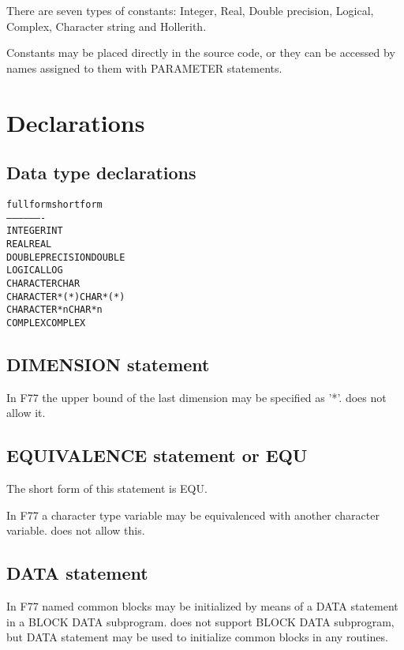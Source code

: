 There are seven types of constants: Integer, Real, Double precision,
Logical, Complex, Character string and Hollerith.
 
Constants may be placed directly in the source code,
or they can be accessed
by names assigned to them with PARAMETER statements.

\section{Declarations}
\label{sec:declarations}
 
\subsection*{Data type declarations}
\begin{alltt}
      full form                  short form
      ---------                  ----------
      INTEGER                    INT
      REAL                       REAL
      DOUBLE PRECISION           DOUBLE
      LOGICAL                    LOG
      CHARACTER                  CHAR
      CHARACTER*(*)              CHAR*(*)
      CHARACTER *n               CHAR *n
      COMPLEX                    COMPLEX
\end{alltt}

\subsection*{DIMENSION statement}

In F77 the upper bound of the last dimension may be
specified as '*'. \COMIS{} does not allow it.
 
\subsection*{EQUIVALENCE statement or EQU}
 
The short form of this statement is EQU.

In F77 a character type variable may be equivalenced
with another character variable. \COMIS{} does not allow this.

\subsection*{DATA statement}
 
In F77 named common blocks may be initialized by means of a
DATA statement in a BLOCK DATA subprogram. \COMIS{} does not
support BLOCK DATA subprogram, but DATA statement may be
used to initialize common blocks in any \COMIS{} routines.
 
